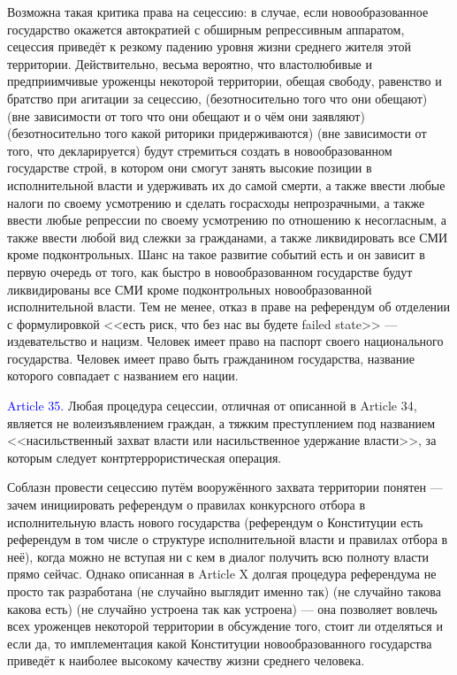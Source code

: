 \documentclass[11pt]{article}
\theoremstyle{remark}
\theoremstyle{definition}
\begin{document}
Возможна такая критика права на сецессию: в случае, если новообразованное государство окажется автократией с обширным репрессивным аппаратом, сецессия приведёт к резкому падению уровня жизни среднего жителя этой территории. Действительно, весьма вероятно, что властолюбивые и предприимчивые уроженцы некоторой территории, обещая свободу, равенство и братство при агитации за сецессию, (безотносительно того что они обещают) (вне зависимости от того что они обещают и о чём они заявляют) (безотносительно того какой риторики придерживаются) (вне зависимости от того, что декларируется) будут стремиться создать в новообразованном государстве строй, в котором они смогут занять высокие позиции в исполнительной власти и удерживать их до самой смерти, а также ввести любые налоги по своему усмотрению и сделать госрасходы непрозрачными, а также ввести любые репрессии по своему усмотрению по отношению к несогласным, а также ввести любой вид слежки за гражданами, а также ликвидировать все СМИ кроме подконтрольных. Шанс на такое развитие событий есть и он зависит в первую очередь от того, как быстро в новообразованном государстве будут ликвидированы все СМИ кроме подконтрольных новообразованной исполнительной власти. Тем не менее, отказ в праве на референдум об отделении с формулировкой <<есть риск, что без нас вы будете failed state>> --- издевательство и нацизм. Человек имеет право на паспорт своего национального государства. Человек имеет право быть гражданином государства, название которого совпадает с названием его нации. 







\color{black}


\textcolor{blue}{Article 35.} Любая процедура сецессии, отличная от описанной в Article 34, является не волеизъявлением граждан, а тяжким преступлением под названием <<насильственный захват власти или насильственное удержание власти>>, за которым следует контртеррористическая операция.

\color{blue}



Соблазн провести сецессию путём вооружённого захвата территории понятен --- зачем инициировать референдум о правилах конкурсного отбора в исполнительную власть нового государства (референдум о Конституции есть референдум в том числе о структуре исполнительной власти и правилах отбора в неё), когда можно не вступая ни с кем в диалог получить всю полноту власти прямо сейчас. Однако описанная в Article X долгая процедура референдума не просто так разработана (не случайно выглядит именно так) (не случайно такова какова есть) (не случайно устроена так как устроена) --- она позволяет вовлечь всех уроженцев некоторой территории в обсуждение того, стоит ли отделяться и если да, то имплементация какой Конституции новообразованного государства приведёт к наиболее высокому качеству жизни среднего человека. 
\end{document}

